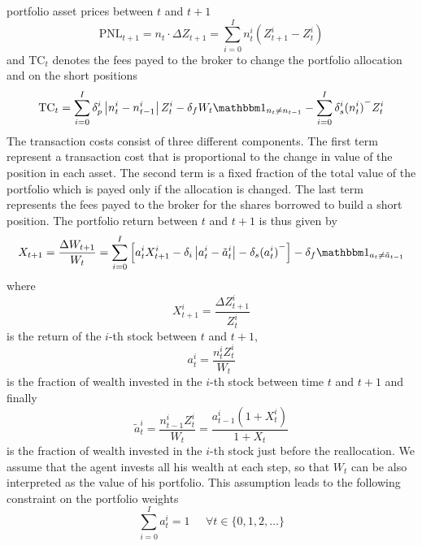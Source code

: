 portfolio asset prices between $t$ and $t+1$
\begin{equation*}
	\text{PNL}_{t+1} = {n}_t \cdot \Delta{Z}_{t+1} = \sum^{I}_{i=0} 
	n_t^i (Z_{t+1}^i - Z_t^i) 
\end{equation*}
and $\text{TC}_t$ denotes the fees payed to the broker to change the portfolio
allocation and on the short positions
\begin{equation*}
	\text{TC}_t = \sum^{I}_{i=0} \delta_p^i \left| n_t^i - n_{t-1}^i\right| Z_t^i 
				- \delta_f W_t \ind{{n}_t \neq {n}_{t-1}} 
				- \sum^{I}_{i=0} \delta_s^i {(n_t^i)}^{-} Z_t^i
\end{equation*}
The transaction costs consist of three different components. The first term 
represent a transaction cost that is proportional to the change in value of the 
position in each asset. The second term is a fixed fraction of the total value
of the portfolio which is payed only if the allocation is changed. The last
term represents the fees payed to the broker for the shares borrowed to build a
short position. The portfolio return between $t$ and $t+1$ is thus given by
\begin{equation}\label{eq:portfolio_return}
	X_{t+1} = \frac{\Delta W_{t+1}}{W_t} = \sum^{I}_{i=0} \left[ a_t^i
	X_{t+1}^i - \delta_i \left| a_t^i - \tilde{a}_t^i \right| - \delta_s
	{(a_t^i)}^- \right] - \delta_f \ind{{a}_t \neq \tilde{{a}}_{t-1}}  
\end{equation}
where 
\begin{equation*}
	X_{t+1}^i = \frac{\Delta Z_{t+1}^i}{Z_t^i}
\end{equation*}
is the return of the $i$-th stock between $t$ and $t+1$, 
\begin{equation*}
	a_t^i = \frac{n_t^i Z_t^i}{W_t}
\end{equation*}
is the fraction of wealth invested in the $i$-th stock between time $t$ and
$t+1$ and finally 
\begin{equation*}
	\tilde{a}_t^i = \frac{n_{t-1}^i Z_t^i}{W_t} = \frac{a_{t-1}^i (1+X_t^i)}
	{1 + X_t}
\end{equation*}
is the fraction of wealth invested in the $i$-th stock just before the 
reallocation. We assume that the agent invests all his wealth at each step, so 
that $W_t$ can be also interpreted as the value of his portfolio. This 
assumption leads to the following constraint on the portfolio weights
\begin{equation}
	\sum^{I}_{i=0} a_t^i = 1 \;\;\;\;\; \forall t \in \{0, 1, 2, \ldots\}
\end{equation}
